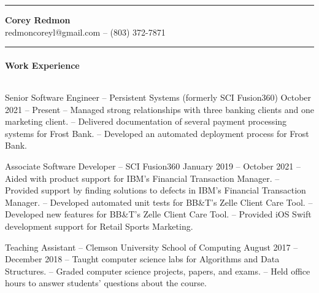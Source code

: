 \documentclass{article}
\begin{document}
  \hrule height 1pt
  \begin{center}
    {\Large \textbf{Corey Redmon}}\\
    redmoncoreyl@gmail.com -- (803) 372-7871
  \end{center}
  \vspace{0.1in}
  \hrule height 1pt

  \setlength{\parskip}{0.0in}
  \setlength{\parindent}{0.4in}

  \paragraph{Work Experience} $ $

  \hangindent=0.8in
  Senior Software Engineer -- Persistent Systems (formerly SCI Fusion360) \hfill October 2021 -- Present \newline
  -- Managed strong relationships with three banking clients and one marketing client. \newline
  -- Delivered documentation of several payment processing systems for Frost Bank. \newline
  -- Developed an automated deployment process for Frost Bank.

  \hangindent=0.8in
  Associate Software Developer -- SCI Fusion360 \hfill January 2019 -- October 2021 \newline
  -- Aided with product support for IBM's Financial Transaction Manager. \newline
  -- Provided support by finding solutions to defects in IBM's Financial Transaction Manager. \newline
  -- Developed automated unit tests for BB\&T's Zelle Client Care Tool. \newline
  -- Developed new features for BB\&T's Zelle Client Care Tool. \newline
  -- Provided iOS Swift development support for Retail Sports Marketing.

  \hangindent=0.8in
  Teaching Assistant -- Clemson University School of Computing \hfill August 2017 -- December 2018 \newline
  -- Taught computer science labs for Algorithms and Data Structures. \newline
  -- Graded computer science projects, papers, and exams. \newline
  -- Held office hours to answer students' questions about the course.
\end{document}
